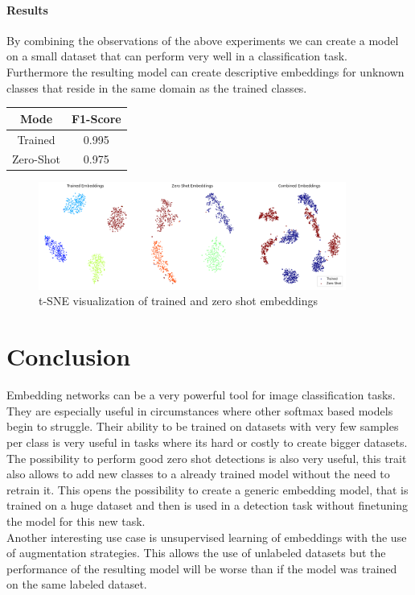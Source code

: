 \documentclass[12pt,a4paper]{report}
\newcommand{\splitlayout}[2]{
	\begin{minipage}{0.6\textwidth}
		#1
	\end{minipage}
	\hfill
	\begin{minipage}{0.35\textwidth}
		#2
	\end{minipage}	
}
\begin{document}
\subsubsection{Results}
\splitlayout{
	By combining the observations of the above experiments we can create a model on a small dataset that can perform very well in a classification task.
	Furthermore the resulting model can create descriptive embeddings for unknown classes that reside in the same domain as the trained classes.
}{
	\begin{tabular}{ | c | c | }
		\hline
		Mode & F1-Score \\ 
		\hline
		Trained & 0.995  \\ 
		\hline
		Zero-Shot & 0.975  \\ 
		\hline
	\end{tabular}
}

\begin{figure}[hb]
	\centering
	\includegraphics[width=0.9\textwidth]{../plots/final.png}
	\caption{t-SNE visualization of trained and zero shot embeddings}
\end{figure}


\chapter{Conclusion}

Embedding networks can be a very powerful tool for image classification tasks.
They are especially useful in circumstances where other softmax based models begin to struggle.
Their ability to be trained on datasets with very few samples per class is very useful in tasks where its hard or costly to create bigger datasets.
The possibility to perform good zero shot detections is also very useful, this trait also allows to add new classes to a already trained model without the need to retrain it.
This opens the possibility to create a generic embedding model, that is trained on a huge dataset and then is used in a detection task without finetuning the model for this new task.
\\
Another interesting use case is unsupervised learning of embeddings with the use of augmentation strategies.
This allows the use of unlabeled datasets but the performance of the resulting model will be worse than if the model was trained on the same labeled dataset.




\end{document}
